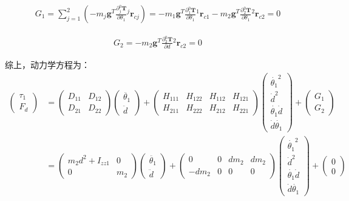\documentclass{homework}
\begin{document}
\begin{sol}
\begin{align*}
  G_1 = \sum_{j=1}^2 (-m_j \mathbf{g}^T \frac{\partial {^0_j}\mathbf{T}}{\partial \theta_1} {^j}\mathbf{r}_{cj}) 
      = -m_1 \mathbf{g}^T \frac{\partial {^0_1}\mathbf{T}}{\partial \theta_1} {^1}\mathbf{r}_{c1} - m_2 \mathbf{g}^T \frac{\partial {^0_2}\mathbf{T}}{\partial \theta_1} {^2}\mathbf{r}_{c2}
      = 0
\end{align*}

\begin{align*}
  G_2 = -m_2 \mathbf{g}^T \frac{\partial {^0_2}\mathbf{T}}{\partial d} {^2}\mathbf{r}_{c2}
      = 0
\end{align*}

综上，动力学方程为：
\begin{align*}
  \begin{pmatrix}
    \tau_1 \\
    F_d
  \end{pmatrix} 
  &=
  \begin{pmatrix}
    D_{11} & D_{12} \\
    D_{21} & D_{22}
  \end{pmatrix}
  \begin{pmatrix}
    \ddot{\theta_1} \\
    \ddot{d}
  \end{pmatrix} +
  \begin{pmatrix}
    H_{111} & H_{122} & H_{112} & H_{121} \\
    H_{211} & H_{222} & H_{212} & H_{221} 
  \end{pmatrix}
  \begin{pmatrix}
    \dot{\theta_1}^2 \\
    \dot{d}^2 \\
    \dot{\theta_1} \dot{d} \\
    \dot{d} \dot{\theta_1}
  \end{pmatrix} +
  \begin{pmatrix}
    G_1 \\
    G_2
  \end{pmatrix} \\
  &=
  \begin{pmatrix}
    m_2 d^2 + I_{zz1} & 0 \\
    0 & m_2
  \end{pmatrix}
  \begin{pmatrix}
    \ddot{\theta_1} \\
    \ddot{d}
  \end{pmatrix} +
  \begin{pmatrix}
    0 & 0 & d m_2 & d m_2 \\
    -d m_2 & 0 & 0 & 0 
  \end{pmatrix}
  \begin{pmatrix}
    \dot{\theta_1}^2 \\
    \dot{d}^2 \\
    \dot{\theta_1} \dot{d} \\
    \dot{d} \dot{\theta_1}
  \end{pmatrix} +
  \begin{pmatrix}
    0 \\
    0
  \end{pmatrix}
\end{align*}


\end{sol}
\end{document}
